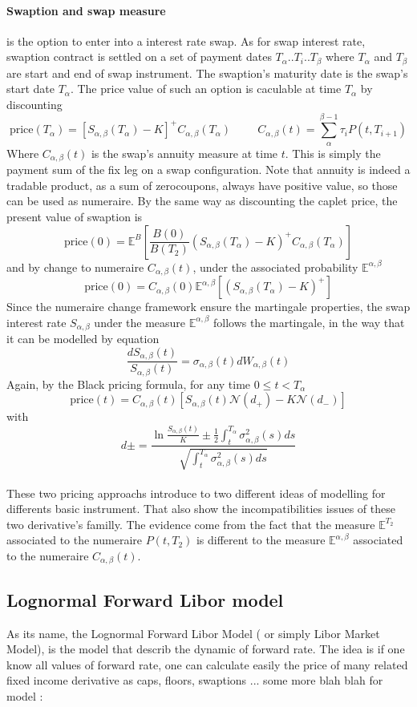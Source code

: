 \documentclass[a4paper,10pt]{article}
\newcommand{\Ta}{T_{\alpha}}
\newcommand{\Tb}{T_{\beta}}
\newcommand{\Ptii}{P(t,T_{i+1})}
\newcommand{\Sab}{S_{\alpha,\beta}}
\newcommand{\Cab}{C_{\alpha,\beta}}
\newcommand{\Wab}{W_{\alpha,\beta}}
\newcommand{\sigmaab}{\sigma_{\alpha,\beta}}
\newcommand{\Eab}{\mathbb{E}^{\alpha,\beta}}
\begin{document}
\paragraph{ Swaption and swap measure } is the option to enter into a interest rate swap. As for swap interest rate, swaption contract is settled on a set of payment dates $\Ta.. T_i.. \Tb$ where $\Ta$ and $\Tb$ are start and end of swap instrument. The swaption's maturity date is the swap's start date $\Ta$. The price value of such an option is caculable at time $\Ta$ by discounting
\[
\text{price}(\Ta) = \left[ \Sab(\Ta) - K \right]^+ \Cab(\Ta)
\hspace{1cm}
\Cab(t) = \sum^{\beta-1}_{\alpha} \tau_i \Ptii 
\]  
Where $\Cab(t)$ is the swap's annuity measure at time $t$. This is simply the payment sum of the fix leg on a swap configuration. Note that annuity is indeed a tradable product, as a sum of zerocoupons, always have positive value, so those can be used as numeraire. By the same way as discounting the caplet price, the present value of swaption is
\[
\text{price}(0) = \mathbb{E}^{B}\left[ \frac{B(0)}{B(T_2)} (\Sab(\Ta) - K )^+ \Cab(\Ta)  \right]
\]
and by change to numeraire $\Cab(t)$, under the associated probability $\Eab$
\[
\text{price}(0) = \Cab(0) \Eab \left[ (\Sab(\Ta) - K )^+  \right]
\]
Since the numeraire change framework ensure the martingale properties, the swap interest rate $\Sab$ under the measure $\Eab$ follows the martingale, in the way that it can be modelled by equation
\[
\frac{d\Sab(t)}{\Sab(t)} = \sigmaab(t) d\Wab(t)
\]
Again, by the Black pricing formula, for any time $0 \leq t < \Ta$
\[
\text{price}(t) = \Cab(t) \left[ \Sab(t) \mathcal{N}(d_+) - K \mathcal{N}(d_-) \right]
\]
with
\[
d\pm = \frac{\ln{\frac{\Sab(t)}{K}} \pm \frac{1}{2}\int_{t}^{\Ta}\sigmaab^2(s)ds  }{ \sqrt{\int_{t}^{\Ta}\sigmaab^2(s)ds} }
\]
\paragraph{} These two pricing approachs introduce to two different ideas of modelling for differents basic instrument. That also show the incompatibilities issues of these two derivative's familly. The evidence come from the fact that the measure $\mathbb{E}^{T_2}$ associated to the numeraire $P(t,T_2)$ is different to the measure $\Eab$ associated to the numeraire $\Cab(t)$.   

\subsection{Lognormal Forward Libor model}
As its name, the Lognormal Forward Libor Model ( or simply Libor Market Model), is the model that describ the dynamic of forward rate. The idea is if one know all values of forward rate, one can calculate easily the price of many related fixed income derivative as caps, floors, swaptions ... {\color{red} some more blah blah for model :}
\end{document}

